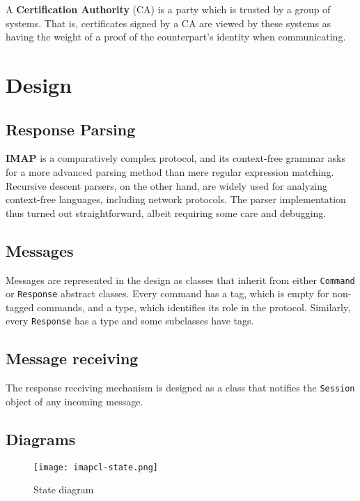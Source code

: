 \documentclass[a4]{report}
\begin{document}
A \textbf{Certification Authority} (CA) is a party which is trusted by a group of systems. That is, certificates signed by a CA are viewed by these systems as having the weight of a proof of the counterpart's identity when communicating.

\chapter{Design}


\section{Response Parsing}

\textbf{IMAP} is a comparatively complex protocol, and its context-free grammar asks for a more advanced parsing method than mere regular expression matching. Recursive descent parsers, on the other hand, are widely used for analyzing context-free languages, including network protocols. The parser implementation thus turned out straightforward, albeit requiring some care and debugging.

\section{Messages}

Messages are represented in the design as classes that inherit from either \texttt{Command} or \texttt{Response} abstract classes. Every command has a tag, which is empty for non-tagged commands, and a type, which identifies its role in the protocol. Similarly, every \texttt{Response} has a type and some subclasses have tags. %

\section{Message receiving}

The response receiving mechanism is designed as a class that notifies the \texttt{Session} object of any incoming message.

\section{Diagrams}

\begin{figure}
  \centering
  \texttt{[image: imapcl-state.png]}
  \caption{State diagram}
  \label{state}
\end{figure}
\end{document}
